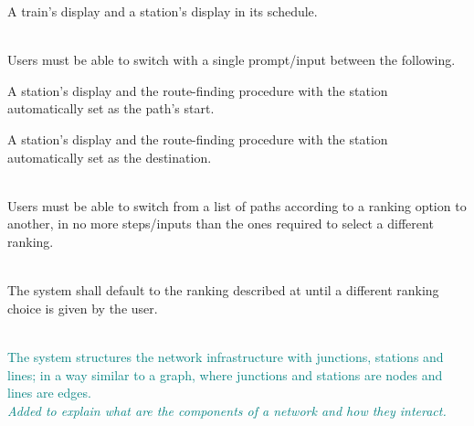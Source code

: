 \noindent A train's display and a station's display in its 
schedule.

 \\
Users must be able to switch with a single prompt/input between the following.


\noindent A station's display and the route-finding 
procedure with the station automatically set as the path's start.


\noindent A station's display and the route-finding 
procedure with the station automatically set as the destination.

 \\

\noindent Users must be able to switch from a list of paths according to a ranking option to another, in no more 
steps/inputs than the ones required to select a different ranking. 

 \\

\noindent The system shall default to the ranking described at  until a different ranking choice is given by the user.

\textcolor{teal}{
 \\
\noindent The system structures the network infrastructure with junctions, stations and lines; in a way similar to a graph, where junctions and stations are nodes and lines are edges.\\
\textit{Added to explain what are the components of a network and how they interact.}
}
